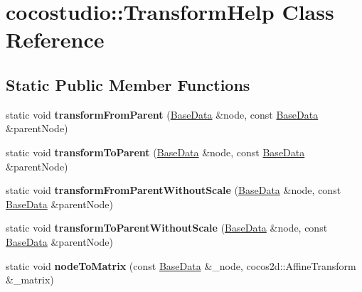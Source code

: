 \hypertarget{classcocostudio_1_1TransformHelp}{}\section{cocostudio\+:\+:Transform\+Help Class Reference}
\label{classcocostudio_1_1TransformHelp}
\subsection*{Static Public Member Functions}
\begin{DoxyCompactItemize}
\item 
\mbox{\label{classcocostudio_1_1TransformHelp_a3c6c67a77686604682c5b66a7a470cbb}} 
static void {\bfseries transform\+From\+Parent} (\hyperlink{classcocostudio_1_1BaseData}{Base\+Data} \&node, const \hyperlink{classcocostudio_1_1BaseData}{Base\+Data} \&parent\+Node)
\item 
\mbox{\label{classcocostudio_1_1TransformHelp_a50113d1982bcd7aecd279a336c82842e}} 
static void {\bfseries transform\+To\+Parent} (\hyperlink{classcocostudio_1_1BaseData}{Base\+Data} \&node, const \hyperlink{classcocostudio_1_1BaseData}{Base\+Data} \&parent\+Node)
\item 
\mbox{\label{classcocostudio_1_1TransformHelp_a8334b726e670b76129fea3a3c3d22048}} 
static void {\bfseries transform\+From\+Parent\+Without\+Scale} (\hyperlink{classcocostudio_1_1BaseData}{Base\+Data} \&node, const \hyperlink{classcocostudio_1_1BaseData}{Base\+Data} \&parent\+Node)
\item 
\mbox{\label{classcocostudio_1_1TransformHelp_ae806f7e76a2bc6f8945b3d58e1ef9257}} 
static void {\bfseries transform\+To\+Parent\+Without\+Scale} (\hyperlink{classcocostudio_1_1BaseData}{Base\+Data} \&node, const \hyperlink{classcocostudio_1_1BaseData}{Base\+Data} \&parent\+Node)
\item 
\mbox{\label{classcocostudio_1_1TransformHelp_a48cb72fa88aa6185ca992bf0713e0189}} 
static void {\bfseries node\+To\+Matrix} (const \hyperlink{classcocostudio_1_1BaseData}{Base\+Data} \&\+\_\+node, cocos2d\+::\+Affine\+Transform \&\+\_\+matrix)

\end{DoxyCompactItemize}
